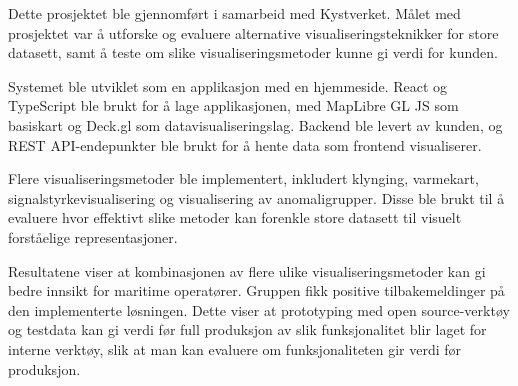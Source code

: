 
Dette prosjektet ble gjennomført i samarbeid med Kystverket. Målet med prosjektet var å utforske og evaluere alternative visualiseringsteknikker for store datasett, samt å teste om slike visualiseringsmetoder kunne gi verdi for kunden.

Systemet ble utviklet som en applikasjon med en hjemmeside. React og TypeScript ble brukt for å lage applikasjonen, med MapLibre GL JS som basiskart og Deck.gl som datavisualiseringslag. Backend ble levert av kunden, og REST API-endepunkter ble brukt for å hente data som frontend visualiserer.

Flere visualiseringsmetoder ble implementert, inkludert klynging, varmekart, signalstyrkevisualisering og visualisering av anomaligrupper. Disse ble brukt til å evaluere hvor effektivt slike metoder kan forenkle store datasett til visuelt forståelige representasjoner.

Resultatene viser at kombinasjonen av flere ulike visualiseringsmetoder kan gi bedre innsikt for maritime operatører. Gruppen fikk positive tilbakemeldinger på den implementerte løsningen. Dette viser at prototyping med open source-verktøy og testdata kan gi verdi før full produksjon av slik funksjonalitet blir laget for interne verktøy, slik at man kan evaluere om funksjonaliteten gir verdi før produksjon. 


